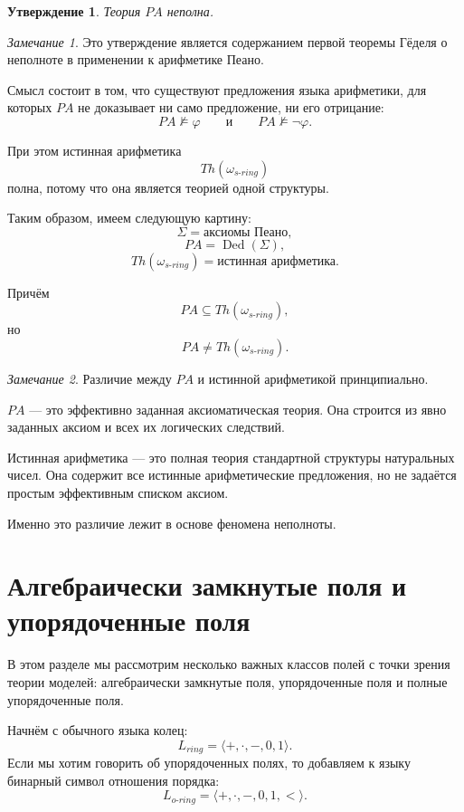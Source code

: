 \documentclass[12pt,a4paper,oneside,openany]{book}
\theoremstyle{definition}
\theoremstyle{plain}
\newtheorem{proposition}{Утверждение}[chapter]
\theoremstyle{remark}
\newtheorem{remark}{Замечание}[chapter]
\begin{document}
\begin{proposition}
Теория $PA$ неполна.
\end{proposition}

\begin{remark}
Это утверждение является содержанием первой теоремы Гёделя о неполноте в применении к арифметике Пеано.

Смысл состоит в том, что существуют предложения языка арифметики, для которых $PA$ не доказывает ни само предложение, ни его отрицание:
\[
PA\not\models\varphi
\qquad
\text{и}
\qquad
PA\not\models\neg\varphi.
\]

При этом истинная арифметика
\[
Th(\omega_{s\text{-}ring})
\]
полна, потому что она является теорией одной структуры.
\end{remark}

Таким образом, имеем следующую картину:
\[
\Sigma=\text{аксиомы Пеано},
\]
\[
PA=\operatorname{Ded}(\Sigma),
\]
\[
Th(\omega_{s\text{-}ring})
=
\text{истинная арифметика}.
\]

Причём
\[
PA\subseteq Th(\omega_{s\text{-}ring}),
\]
но
\[
PA\ne Th(\omega_{s\text{-}ring}).
\]

\begin{remark}
Различие между $PA$ и истинной арифметикой принципиально.

$PA$ — это эффективно заданная аксиоматическая теория. Она строится из явно заданных аксиом и всех их логических следствий.

Истинная арифметика — это полная теория стандартной структуры натуральных чисел. Она содержит все истинные арифметические предложения, но не задаётся простым эффективным списком аксиом.

Именно это различие лежит в основе феномена неполноты.
\end{remark}

\section{Алгебраически замкнутые поля и упорядоченные поля}

В этом разделе мы рассмотрим несколько важных классов полей с точки зрения теории моделей:
алгебраически замкнутые поля, упорядоченные поля и полные упорядоченные поля.

Начнём с обычного языка колец:
\[
L_{ring}=\langle +,\cdot,-,0,1\rangle.
\]
Если мы хотим говорить об упорядоченных полях, то добавляем к языку бинарный символ отношения порядка:
\[
L_{o\text{-}ring}=\langle +,\cdot,-,0,1,<\rangle.
\]
\end{document}
